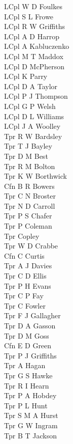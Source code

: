 \begin{multicols}{2}
  LCpl W D Foulkes \\
  LCpl S L Frowe \\
  LCpl R W Griffiths \\
  LCpl A D Harrop \\
  LCpl A Kabluczenko \\
  LCpl M T Maddox \\
  LCpl D McPherson \\
  LCpl K Parry \\
  LCpl D A Taylor \\
  LCpl P J Thompson \\
  LCpl G P Welsh \\
  LCpl D L Williams \\
  LCpl J A Woolley \\
  Tpr R W Bardsley \\
  Tpr T J Bayley \\
  Tpr D M Best \\
  Tpr R M Bolton \\
  Tpr K W Borthwick \\
  Cfn B R Bowers \\
  Tpr C N Broster \\
  Tpr N D Carroll \\
  Tpr P S Chafer \\
  Tpr P Coleman \\
  Tpr Copley \\
  Tpr W D Crabbe \\
  Cfn C Curtis \\
  Tpr A J Davies \\
  Tpr C D Ellis \\
  Tpr P H Evans \\
  Tpr C P Fay \\
  Tpr C Fowler \\
  Tpr F J Gallagher \\
  Tpr D A Gasson \\
  Tpr D M Goss \\
  Cfn E D Green \\
  Tpr P J Griffiths \\
  Tpr A Hagan \\
  Tpr G S Hawke \\
  Tpr R I Hearn \\
  Tpr P A Hobdey \\
  Tpr P L Hunt \\
  Tpr S M A Hurst \\
  Tpr G W Ingram \\
  Tpr B T Jackson \\

\end{multicols}
